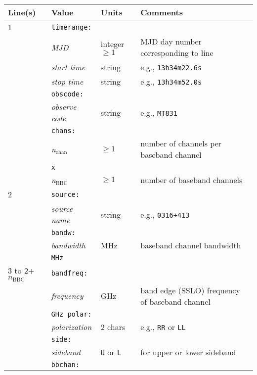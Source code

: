 \begin{center}
\begin{tabular}{l l l l}
\hline
Line(s) & Value & Units & Comments \\
\hline
1 & {\tt timerange:}          &                    & \\
  & {\it MJD}                 & integer $\ge 1$    & MJD day number corresponding to line \\
  & {\it start time}          & string             & e.g., {\tt 13h34m22.6s} \\
  & {\it stop time}           & string             & e.g., {\tt 13h34m52.0s} \\
  & {\tt obscode:}            &                    & \\
  & {\it observe code}        & string             & e.g., {\tt MT831} \\
  & {\tt chans:}              &                    & \\
  & {\it n}$_{\mathrm{chan}}$ & $\ge 1$            & number of channels per baseband channel \\
  & {\tt x}                   &                    & \\
  & {\it n}$_{\mathrm{BBC}}$  & $\ge 1$            & number of baseband channels \\
\hline
2 & {\tt source:}             &                    & \\
  & {\it source name}         & string             & e.g., {\tt 0316+413} \\
  & {\tt bandw:}              &                    & \\
  & {\it bandwidth}           & MHz                & baseband channel bandwidth \\
  & {\tt MHz}                 &                    & \\
\hline
3 to 2+$n_{\mathrm{BBC}}$ 
  & {\tt bandfreq:}           &                    & \\
  & {\it frequency}           & GHz                & band edge (SSLO) frequency of baseband channel \\
  & {\tt GHz polar:}          &                    & \\
  & {\it polarization}        & 2 chars            & e.g., {\tt RR} or {\tt LL} \\
  & {\tt side:}               &                    & \\
  & {\it sideband}            & {\tt U} or {\tt L} & for upper or lower sideband \\
  & {\tt bbchan:}             &                    & \\

\end{tabular}
\end{center}
